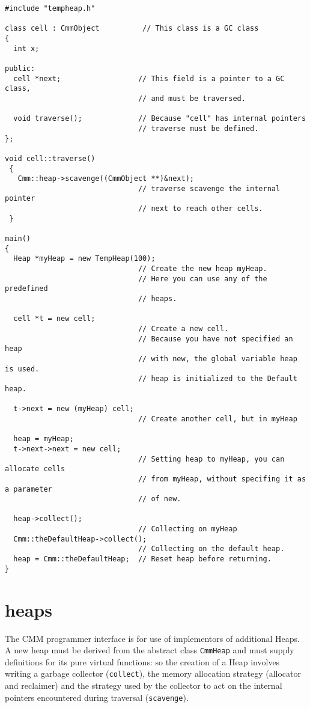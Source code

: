 \begin{verbatim}
#include "tempheap.h"

class cell : CmmObject          // This class is a GC class
{
  int x;

public: 
  cell *next;                  // This field is a pointer to a GC class,
                               // and must be traversed.

  void traverse();             // Because "cell" has internal pointers
                               // traverse must be defined.
};

void cell::traverse()
 { 
   Cmm::heap->scavenge((CmmObject **)&next); 
                               // traverse scavenge the internal pointer
                               // next to reach other cells.
 }

main()
{
  Heap *myHeap = new TempHeap(100);
                               // Create the new heap myHeap.
                               // Here you can use any of the predefined
                               // heaps.

  cell *t = new cell;
                               // Create a new cell. 
                               // Because you have not specified an heap
                               // with new, the global variable heap is used.
                               // heap is initialized to the Default heap.

  t->next = new (myHeap) cell;
                               // Create another cell, but in myHeap

  heap = myHeap;
  t->next->next = new cell;
                               // Setting heap to myHeap, you can allocate cells
                               // from myHeap, without specifing it as a parameter
                               // of new.

  heap->collect();
                               // Collecting on myHeap
  Cmm::theDefaultHeap->collect();
                               // Collecting on the default heap.
  heap = Cmm::theDefaultHeap;  // Reset heap before returning.
}
\end{verbatim}

\section {heaps}

The CMM programmer interface is for use of implementors of
additional Heaps. A new heap must be derived from the abstract
class {\tt CmmHeap} and must supply definitions for its pure virtual
functions: so the creation of a Heap involves writing a garbage
collector ({\tt collect}), the memory allocation strategy (allocator and
reclaimer) and the strategy used by the collector to act on the
internal pointers encountered during traversal ({\tt scavenge}).

